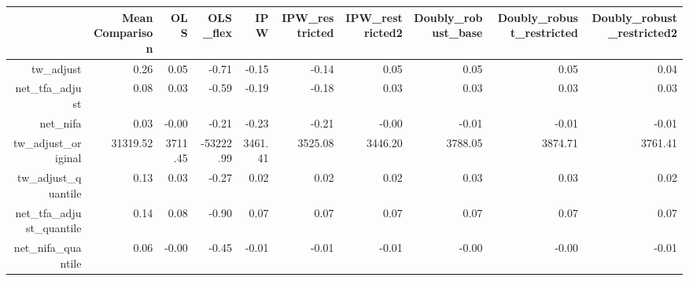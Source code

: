 \documentclass[10pt,a4paper]{article}
\begin{document}
\begin{landscape}
\begin{table}[ht]
\centering
\begin{tabular}{rrrrrrrrrr}
  \hline
 & Mean Comparison & OLS & OLS\_flex & IPW & IPW\_restricted & IPW\_restricted2 & Doubly\_robust\_base & Doubly\_robust\_restricted & Doubly\_robust\_restricted2 \\ 
  \hline
tw\_adjust & 0.26 & 0.05 & -0.71 & -0.15 & -0.14 & 0.05 & 0.05 & 0.05 & 0.04 \\ 
  net\_tfa\_adjust & 0.08 & 0.03 & -0.59 & -0.19 & -0.18 & 0.03 & 0.03 & 0.03 & 0.03 \\ 
  net\_nifa & 0.03 & -0.00 & -0.21 & -0.23 & -0.21 & -0.00 & -0.01 & -0.01 & -0.01 \\ 
  tw\_adjust\_original & 31319.52 & 3711.45 & -53222.99 & 3461.41 & 3525.08 & 3446.20 & 3788.05 & 3874.71 & 3761.41 \\ 
  tw\_adjust\_quantile & 0.13 & 0.03 & -0.27 & 0.02 & 0.02 & 0.02 & 0.03 & 0.03 & 0.02 \\ 
  net\_tfa\_adjust\_quantile & 0.14 & 0.08 & -0.90 & 0.07 & 0.07 & 0.07 & 0.07 & 0.07 & 0.07 \\ 
  net\_nifa\_quantile & 0.06 & -0.00 & -0.45 & -0.01 & -0.01 & -0.01 & -0.00 & -0.00 & -0.01 \\ 
   \hline
\end{tabular}
\end{table}
\end{landscape}
\end{document}
